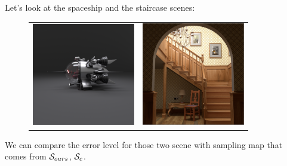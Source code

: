 \documentclass{classeENS}
\begin{document}
Let's look at the spaceship and the staircase scenes:
\begin{figure}[H]
    \centering
    \begin{tabular}{cc}
    \includegraphics[width=45mm]{image/final/gt.png}&
    \includegraphics[width=45mm]{image/final2/gt.png}
    \end{tabular}
\end{figure}

We can compare the error level for those two scene with sampling map that comes from $\mathcal S_{ours}$, $\mathcal S_{c}$.
\end{document}
